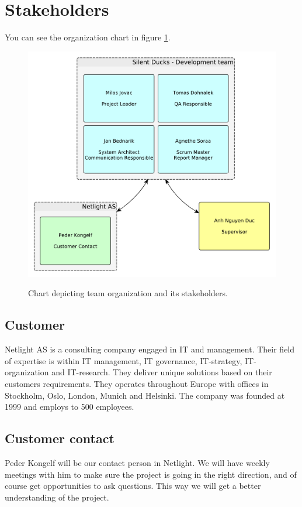 \section{Stakeholders}
You can see the organization chart in figure \ref{img:organization_chart}.
\begin{figure}[h]
    \begin{center}
    \includegraphics[scale=0.4]{images/organization_chart.pdf}
    \label{img:organization_chart}
    \caption{Chart depicting team organization and its stakeholders.}
    \end{center}
\end{figure}
\subsection{Customer}
Netlight AS is a consulting company engaged in IT and management. Their field of expertise is within IT management, IT governance, IT-strategy, IT-organization and IT-research. They deliver unique solutions based on their customers requirements. They operates throughout Europe with offices in Stockholm, Oslo, London, Munich and Helsinki. The company was founded at 1999 and employs to 500 employees. 
\subsection{Customer contact}
Peder Kongelf will be our contact person in Netlight. We will have weekly meetings with him to make sure the project is going in the right direction, and of course get opportunities to ask questions. This way we will get a better understanding of the project.

